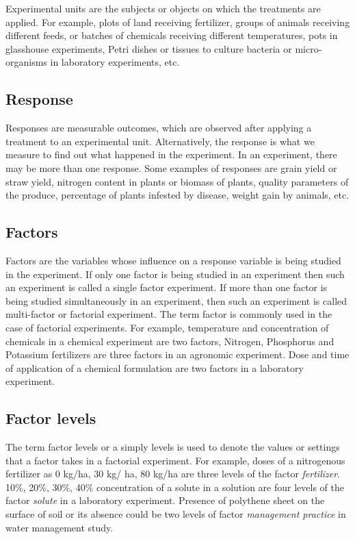 \documentclass[
]{book}
\begin{document}
Experimental units are the subjects or objects on which the treatments are applied. For example, plots of land receiving fertilizer, groups of animals receiving different feeds, or batches of chemicals receiving different temperatures, pots in glasshouse experiments, Petri dishes or tissues to culture bacteria or micro-organisms in laboratory experiments, etc.

\hypertarget{response}{%
\subsection{Response}\label{response}}

Responses are measurable outcomes, which are observed after applying a treatment to an experimental unit. Alternatively, the response is what we measure to find out what happened
in the experiment. In an experiment, there may be more than one response. Some examples of responses are grain yield or straw yield, nitrogen content in plants or biomass of plants, quality parameters of the produce, percentage of plants infested by disease, weight gain by animals, etc.

\hypertarget{factors}{%
\subsection{Factors}\label{factors}}

Factors are the variables whose influence on a response variable is being studied in the experiment. If only one factor is being studied in an experiment then such an experiment is called a single factor experiment. If more than one factor is being studied simultaneously in an experiment, then such an experiment is called multi-factor or factorial experiment. The term factor is commonly used in the case of factorial experiments. For example, temperature and concentration of chemicals in a chemical experiment are two factors, Nitrogen, Phosphorus and Potassium fertilizers are three factors in an agronomic experiment. Dose and time of application of a chemical formulation are two factors in a laboratory experiment.

\hypertarget{factor-levels}{%
\subsection{Factor levels}\label{factor-levels}}

The term factor levels or a simply levels is used to denote the values or settings that a factor takes in a factorial experiment. For example, doses of a nitrogenous fertilizer as 0 kg/ha, 30 kg/ ha, 80 kg/ha are three levels of the factor \emph{fertilizer}. 10\%, 20\%, 30\%, 40\% concentration of a solute in a solution are four levels of the factor \emph{solute} in a laboratory experiment. Presence of polythene sheet on the surface of soil or its absence could be two levels of factor \emph{management practice} in water management study.
\end{document}
